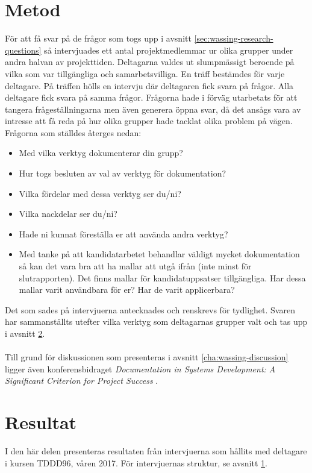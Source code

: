 \section{Metod}
\label{cha:wassing-method}
För att få svar på de frågor som togs upp i avsnitt \ref{sec:wassing-research-questions} så intervjuades ett antal projektmedlemmar ur olika grupper under andra halvan av projekttiden. Deltagarna valdes ut slumpmässigt beroende på vilka som var tillgängliga och samarbetsvilliga. En träff bestämdes för varje deltagare. På träffen hölls en intervju där deltagaren fick svara på frågor. Alla deltagare fick svara på samma frågor. Frågorna hade i förväg utarbetats för att tangera frågeställningarna men även generera öppna svar, då det ansågs vara av intresse att få reda på hur olika grupper hade tacklat olika problem på vägen. Frågorna som ställdes återges nedan: %
\begin{itemize}
\item{Med vilka verktyg dokumenterar din grupp?}
\item{Hur togs besluten av val av verktyg för dokumentation?}
\item{Vilka fördelar med dessa verktyg ser du/ni?}
\item{Vilka nackdelar ser du/ni?}
\item{Hade ni kunnat föreställa er att använda andra verktyg?}
\item{Med tanke på att kandidatarbetet behandlar väldigt mycket dokumentation så kan det vara bra att ha mallar att utgå ifrån (inte minst för slutrapporten). Det finns mallar för kandidatuppsatser tillgängliga. Har dessa mallar varit användbara för er? Har de varit applicerbara?}
\end{itemize}
Det som sades på intervjuerna antecknades och renskrevs för tydlighet. Svaren har sammanställts utefter vilka verktyg som deltagarnas grupper valt och tas upp i avsnitt \ref{cha:wassing-results}.
\\ \\
Till grund för diskussionen som presenteras i avsnitt \ref{cha:wassing-discussion} ligger även konferensbidraget \textit{Documentation in Systems Development: A Significant Criterion for Project
Success} \cite{docsystemdev}. %

\section{Resultat}
\label{cha:wassing-results}
I den här delen presenteras resultaten från intervjuerna som hållits med deltagare i kursen TDDD96, våren 2017. För intervjuernas struktur, se avsnitt \ref{cha:wassing-method}.

